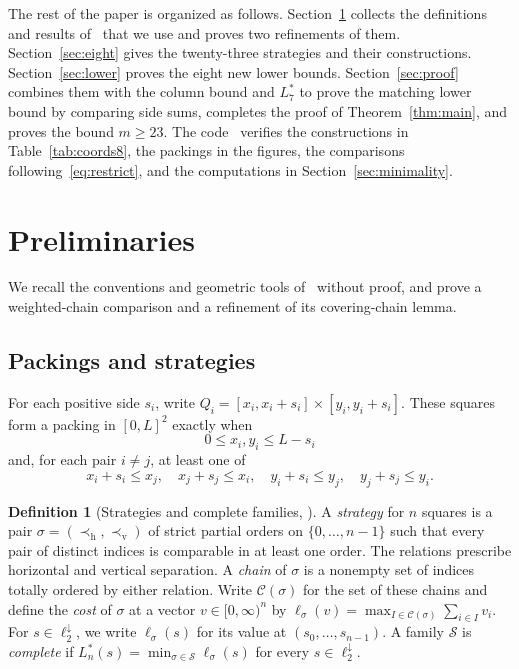 \documentclass[12pt]{amsart}
\theoremstyle{definition}
\newtheorem{definition}[theorem]{Definition}
\theoremstyle{remark}
\numberwithin{equation}{section}
\numberwithin{figure}{section}
\numberwithin{table}{section}
\begin{document}
The rest of the paper is organized as follows. Section~\ref{sec:prelim}
collects the definitions and results of~\cite{BadgerSeven} that we use and
proves two refinements of them. Section~\ref{sec:eight} gives the
twenty-three strategies and their constructions. Section~\ref{sec:lower}
proves the eight new lower bounds. Section~\ref{sec:proof} combines them with
the column bound and $L_7^*$ to prove the matching lower bound by comparing side sums,
completes the proof of Theorem~\ref{thm:main}, and proves the bound
$m\ge23$. The code~\cite{BadgerCode} verifies the constructions in
Table~\ref{tab:coords8}, the packings in the figures, the comparisons
following~\eqref{eq:restrict}, and the computations in
Section~\ref{sec:minimality}.

\section{Preliminaries}\label{sec:prelim}
We recall the conventions and geometric tools of~\cite{BadgerSeven}
without proof, and prove a weighted-chain comparison and a refinement of
its covering-chain lemma.

\subsection{Packings and strategies}
For each positive side $s_i$, write
$Q_i=[x_i,x_i+s_i]\times[y_i,y_i+s_i]$.
These squares form a packing in $[0,L]^2$ exactly when
\begin{equation}\label{eq:contain}
0\le x_i,y_i\le L-s_i
\end{equation}
and, for each pair $i\ne j$, at least one of
\begin{equation}\label{eq:sep}
x_i+s_i\le x_j,\quad x_j+s_j\le x_i,\quad
y_i+s_i\le y_j,\quad y_j+s_j\le y_i.
\end{equation}
\begin{definition}[Strategies and complete families, {\cite[Definition~2.3]{BadgerSeven}}]\label{def:strategy}\label{def:complete}
A \emph{strategy} for $n$ squares is a pair
$\sigma=(\prec_{\mathrm h},\prec_{\mathrm v})$ of strict partial orders on
$\{0,\ldots,n-1\}$ such that every pair of distinct indices is comparable
in at least one order. The relations prescribe horizontal and vertical
separation. A \emph{chain} of $\sigma$ is a nonempty set of indices totally
ordered by either relation. Write $\mathcal C(\sigma)$ for the set of these
chains and define the \emph{cost} of $\sigma$ at a vector
$v\in[0,\infty)^n$ by
$\ell_\sigma(v)=\max_{I\in\mathcal C(\sigma)}\sum_{i\in I}v_i$. For
$s\in\ell_2^\downarrow$, we write $\ell_\sigma(s)$ for its value at
$(s_0,\ldots,s_{n-1})$.
A family $\mathcal S$ is \emph{complete} if
$L_n^*(s)=\min_{\sigma\in\mathcal S}\ell_\sigma(s)$ for every
$s\in\ell_2^\downarrow$.
\end{definition}
\end{document}
